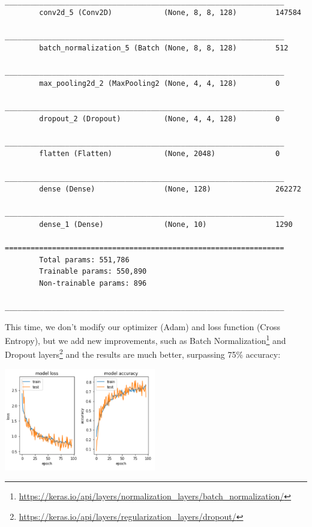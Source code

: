 \begin{center}
\begin{verbatim}
        _________________________________________________________________
        conv2d_5 (Conv2D)            (None, 8, 8, 128)         147584    
        _________________________________________________________________
        batch_normalization_5 (Batch (None, 8, 8, 128)         512       
        _________________________________________________________________
        max_pooling2d_2 (MaxPooling2 (None, 4, 4, 128)         0         
        _________________________________________________________________
        dropout_2 (Dropout)          (None, 4, 4, 128)         0         
        _________________________________________________________________
        flatten (Flatten)            (None, 2048)              0         
        _________________________________________________________________
        dense (Dense)                (None, 128)               262272    
        _________________________________________________________________
        dense_1 (Dense)              (None, 10)                1290      
        =================================================================
        Total params: 551,786
        Trainable params: 550,890
        Non-trainable params: 896
        _________________________________________________________________
    \end{verbatim}
\end{center}
This time, we don't modify our optimizer (Adam) and loss function (Cross Entropy),
but we add new improvements, such as Batch Normalization\footnote{\href{https://keras.io/api/layers/normalization\_layers/batch\_normalization/}{https://keras.io/api/layers/normalization\_layers/batch\_normalization/}}
and Dropout layers\footnote{\href{https://keras.io/api/layers/regularization\_layers/dropout/}{https://keras.io/api/layers/regularization\_layers/dropout/}}
and the results are much better, surpassing 75\% accuracy:
\begin{center}
    \captionsetup{type=figure}
    \includegraphics[width=250px]{sections/exp-1/images/model-2-acc.png}
\end{center}

